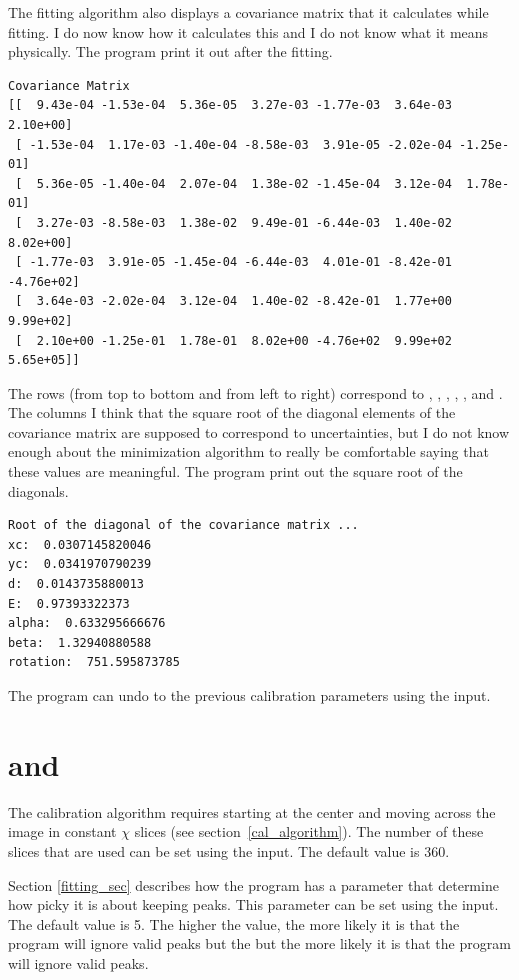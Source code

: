 The fitting algorithm also displays a covariance matrix that 
it calculates while fitting. I do now know how it calculates this 
and I do not know what it means physically. 
The program print it out after the fitting. 
\begin{lstlisting}[caption={A Covariance Matrix},
    basicstyle=\ttfamily\footnotesize]
Covariance Matrix
[[  9.43e-04 -1.53e-04  5.36e-05  3.27e-03 -1.77e-03  3.64e-03  2.10e+00]
 [ -1.53e-04  1.17e-03 -1.40e-04 -8.58e-03  3.91e-05 -2.02e-04 -1.25e-01]
 [  5.36e-05 -1.40e-04  2.07e-04  1.38e-02 -1.45e-04  3.12e-04  1.78e-01]
 [  3.27e-03 -8.58e-03  1.38e-02  9.49e-01 -6.44e-03  1.40e-02  8.02e+00]
 [ -1.77e-03  3.91e-05 -1.45e-04 -6.44e-03  4.01e-01 -8.42e-01 -4.76e+02]
 [  3.64e-03 -2.02e-04  3.12e-04  1.40e-02 -8.42e-01  1.77e+00  9.99e+02]
 [  2.10e+00 -1.25e-01  1.78e-01  8.02e+00 -4.76e+02  9.99e+02  5.65e+05]]
\end{lstlisting}
The rows (from top to bottom and from left to right) correspond 
to , , 
, , , and . The columns
I think that the square root of the diagonal elements of the covariance 
matrix are supposed to correspond to uncertainties, but I do not know 
enough about the minimization algorithm to really be comfortable saying 
that these values are meaningful. The program print out the square root of 
the diagonals. 
\begin{lstlisting}[caption={Display of the root of the diagonals}]
Root of the diagonal of the covariance matrix ... 
xc:  0.0307145820046
yc:  0.0341970790239
d:  0.0143735880013
E:  0.97393322373
alpha:  0.633295666676
beta:  1.32940880588
rotation:  751.595873785
\end{lstlisting}
The program can undo to the previous calibration
parameters using the  input.

\section{\texorpdfstring{ 
        and }{``Number of 
        Chi'' and ``Stddev?''}}
        \label{num_chi_and_stddev}

The calibration algorithm requires starting
at the center and moving across the image in constant
$\chi$ slices (see section~\ref{cal_algorithm}).
The number of these slices that are used
can be set using the  input. 
The default value is 360. 

Section \ref{fitting_sec} describes how the program
has a parameter that determine how picky it is
about keeping peaks. This parameter can be set using the 
 input. The default value is 5. The higher 
the value, the more likely it is that the program will ignore
valid peaks but the but the more likely it is that the program
will ignore valid peaks.

